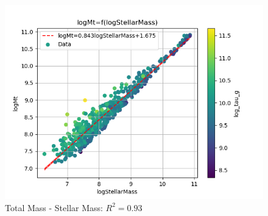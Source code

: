\documentclass[a4paper]{article}
\begin{document}
\begin{figure}[htbp]
\centering
\includegraphics[width=.9\linewidth]{./graphs/logStellarMass-logMtcolor_log_tau_g.png}
\caption{\label{Total Mass - Stellar Mass}Total Mass - Stellar Mass: \(R^2=0.93\)}
\end{figure}
\end{document}
